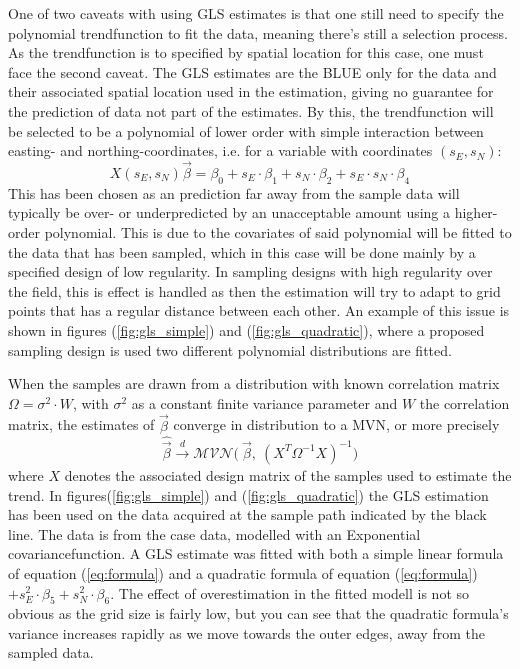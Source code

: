 One of two caveats with using GLS estimates is that one still need to specify the polynomial trendfunction to fit the data, meaning there's still a selection process. As the trendfunction is to specified by spatial location for this case, one must face the second caveat. The GLS estimates are the BLUE only for the data and their associated spatial location used in the estimation, giving no guarantee for the prediction of data not part of the estimates. By this, the trendfunction will be selected to be a polynomial of lower order with simple interaction between easting- and northing-coordinates, i.e. for a variable with coordinates $(s_E, s_N)$:
\begin{equation} \label{eq:formula}
X(s_E, s_N)\vec{\beta} = \beta_0 + s_{E} \cdot \beta_1 + s_{N} \cdot \beta_2 + s_{E} \cdot s_{N} \cdot \beta_4 
\end{equation} 
This has been chosen as an prediction far away from the sample data will typically be over- or underpredicted by an unacceptable amount using a higher-order polynomial. This is due to the covariates of said polynomial will be fitted to the data that has been sampled, which in this case will be done mainly by a specified design of low regularity. In sampling designs with high regularity over the field, this is effect is handled as then the estimation will try to adapt to grid points that has a regular distance between each other. An example of this issue is shown in figures (\ref{fig:gls_simple}) and (\ref{fig:gls_quadratic}), where a proposed sampling design is used two different polynomial distributions are fitted. 

When the samples are drawn from a distribution with known correlation matrix $\Omega = \sigma^2 \cdot W$, with $\sigma^2$ as a constant finite variance parameter and $W$ the correlation matrix, the estimates of $\vec{\beta}$ converge in distribution to a MVN, or more precisely
\begin{equation}
\hat{\vec{\beta}} \xrightarrow[]{d} \mathcal{MVN} \big( \ \vec{\beta}, \ (X^T \Omega^{-1} X)^{-1} \big)
\end{equation}
where $X$ denotes the associated design matrix of the samples used to estimate the trend. In figures(\ref{fig:gls_simple}) and (\ref{fig:gls_quadratic}) the GLS estimation has been used on the data acquired at the sample path indicated by the black line. The data is from the case data, modelled with an Exponential covariancefunction. A GLS estimate was fitted with both a simple linear formula of equation (\ref{eq:formula}) and a quadratic formula of equation (\ref{eq:formula}) $+ s_{E}^2 \cdot \beta_5 + s_{N}^2 \cdot \beta_6$. The effect of overestimation in the fitted modell is not so obvious as the grid size is fairly low, but you can see that the quadratic formula's variance increases rapidly as we move towards the outer edges, away from the sampled data. 

